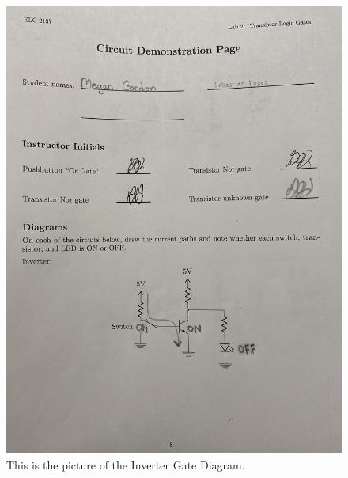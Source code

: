 \documentclass[11pt]{article}
\begin{document}
	\begin{figure}[ht]\centering
		\includegraphics[width=\textwidth, angle=270 ,trim=50 50 50 50,clip]{Inverter_Gate}
		\caption{This is the picture of the Inverter Gate Diagram.}
		\label{fig:Inverter_Gate}
	\end{figure}
	
\end{document}
